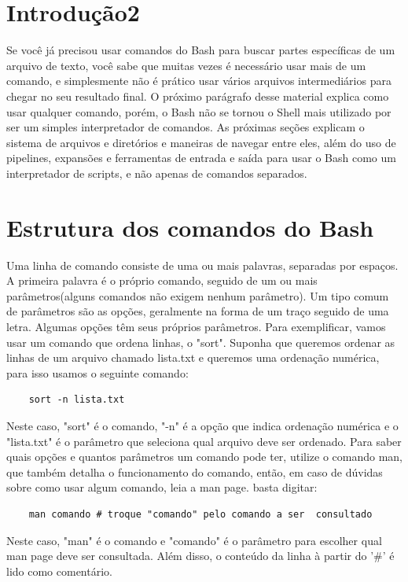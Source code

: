 	\section{Introdução2 }
	Se você já precisou usar comandos do Bash para buscar partes específicas de um arquivo de texto, você sabe que muitas vezes é necessário usar mais de um comando, e simplesmente não é prático usar vários arquivos intermediários para chegar no seu resultado final. O próximo parágrafo desse material explica como usar qualquer comando, porém, o Bash não se tornou o Shell mais utilizado por ser um simples interpretador de comandos. As próximas seções explicam o sistema de arquivos e diretórios e maneiras de navegar entre eles, além do uso de pipelines, expansões e ferramentas de entrada e saída para usar o Bash como um interpretador de scripts, e não apenas de comandos separados.
	
	\section{Estrutura dos comandos do Bash}
	Uma linha de comando consiste de uma ou mais palavras, separadas por espaços. A primeira palavra é o próprio comando, seguido de um ou mais parâmetros(alguns comandos não exigem nenhum parâmetro). Um tipo comum de parâmetros são as opções, geralmente na forma de um traço seguido de uma letra. Algumas opções têm seus próprios parâmetros. Para exemplificar, vamos usar um comando que ordena linhas, o "sort". Suponha que queremos ordenar as linhas de um arquivo chamado lista.txt e queremos uma ordenação numérica, para isso usamos o seguinte comando:
	\begin{lstlisting}
	sort -n lista.txt
	\end{lstlisting}
	Neste caso, "sort" é o comando, "-n" é a opção que indica ordenação numérica e o "lista.txt" é o parâmetro que seleciona qual arquivo deve ser ordenado.
	Para saber quais opções e quantos parâmetros um comando pode ter, utilize o comando man, que também detalha o funcionamento do comando, então, em caso de dúvidas sobre como usar algum comando, leia a man page. basta digitar:
	\begin{lstlisting}
	man comando # troque "comando" pelo comando a ser  consultado
	\end{lstlisting}
	Neste caso, "man" é o comando e "comando" é o parâmetro para escolher qual man page deve ser consultada. Além disso, o conteúdo da linha à partir do '\#' é lido como comentário.
	
